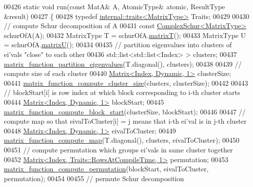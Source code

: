 \begin{DoxyCode}
00426   \textcolor{keyword}{static} \textcolor{keywordtype}{void} run(\textcolor{keyword}{const} MatA& A, AtomicType& atomic, ResultType &result)
00427   \{
00428     \textcolor{keyword}{typedef} \hyperlink{struct_eigen_1_1internal_1_1traits}{internal::traits<MatrixType>} Traits;
00429     
00430     \textcolor{comment}{// compute Schur decomposition of A}
00431     \textcolor{keyword}{const} \hyperlink{group___eigenvalues___module}{ComplexSchur<MatrixType>} schurOfA(A);  
00432     MatrixType T = schurOfA.\hyperlink{group___eigenvalues___module_add3ab5ed83f7f2f06b79fa910a2d5684}{matrixT}();
00433     MatrixType U = schurOfA.\hyperlink{group___eigenvalues___module_afed8177cf9836f032d42bdb6c6bc6e01}{matrixU}();
00434 
00435     \textcolor{comment}{// partition eigenvalues into clusters of ei'vals "close" to each other}
00436     std::list<std::list<Index> > clusters; 
00437     \hyperlink{namespace_eigen_1_1internal_a9291a6ab4fe0ad1346049a8f2feddeaa}{matrix\_function\_partition\_eigenvalues}(T.diagonal(), clusters);
00438 
00439     \textcolor{comment}{// compute size of each cluster}
00440     \hyperlink{group___core___module_class_eigen_1_1_matrix}{Matrix<Index, Dynamic, 1>} clusterSize;
00441     \hyperlink{namespace_eigen_1_1internal_a1073ba7ac499827baa04c814e4251326}{matrix\_function\_compute\_cluster\_size}(clusters, clusterSize);
00442 
00443     \textcolor{comment}{// blockStart[i] is row index at which block corresponding to i-th cluster starts }
00444     \hyperlink{group___core___module_class_eigen_1_1_matrix}{Matrix<Index, Dynamic, 1>} blockStart; 
00445     \hyperlink{namespace_eigen_1_1internal_a2144f635d30028a25e7eb3510c315ad3}{matrix\_function\_compute\_block\_start}(clusterSize, blockStart);
00446 
00447     \textcolor{comment}{// compute map so that eivalToCluster[i] = j means that i-th ei'val is in j-th cluster }
00448     \hyperlink{group___core___module_class_eigen_1_1_matrix}{Matrix<Index, Dynamic, 1>} eivalToCluster;
00449     \hyperlink{namespace_eigen_1_1internal_ade67364a006320cd7103f0f3366def09}{matrix\_function\_compute\_map}(T.diagonal(), clusters, eivalToCluster);
00450 
00451     \textcolor{comment}{// compute permutation which groups ei'vals in same cluster together }
00452     \hyperlink{group___core___module_class_eigen_1_1_matrix}{Matrix<Index, Traits::RowsAtCompileTime, 1>} permutation;
00453     \hyperlink{namespace_eigen_1_1internal_a0434fe5b0ec47e69b8e351ef9e131bcd}{matrix\_function\_compute\_permutation}(blockStart, eivalToCluster, 
      permutation);
00454 
00455     \textcolor{comment}{// permute Schur decomposition}

\end{DoxyCode}
